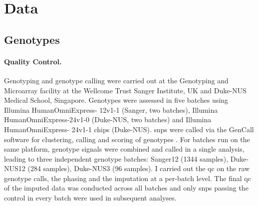 \section{Data}
\subsection{Genotypes}
\label{subsection:genotypes}
\paragraph{Quality Control.} Genotyping and genotype calling were carried out at the Genotyping and Microarray facility at the Wellcome Trust Sanger Institute, UK and Duke-NUS Medical School, Singapore. Genotypes were assessed in five batches using Illumina HumanOmniExpress- 12v1-1 (Sanger, two batches), Illumina HumanOmniEx\-press-24v1-0 (Duke-NUS, two batches) and Illumina HumanOmniExpress- 24v1-1 chips (Duke-NUS). \glspl{snp} were called via the GenCall software for clustering, calling and scoring of genotypes \citep{Teo2007}. For batches run on the same platform, genotype signals were combined and called in a single analysis, leading to three independent genotype batches: Sanger12 (\num{1344} samples), Duke-NUS12 (\num{284} samples), Duke-NUS3 (\num{96} samples). I carried out the \gls{qc} on the raw genotype calls, the phasing and the imputation at a per-batch level. The final \gls{qc} of the imputed data was conducted across all batches and only \glspl{snp} passing the control in every batch were used in subsequent analyses. 

